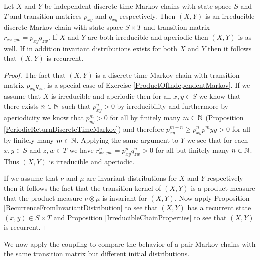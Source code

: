 \begin{lem}\label{CouplingIndependentMarkovChainsDiscreteTime}Let $X$ and $Y$ be independent discrete time
  Markov chains with state space $S$ and $T$ and transition matrices $p_{xy}$
  and $q_{xy}$ respectively.  Then $(X,Y)$ is an irreducible discrete
  Markov chain with state space $S \times T$ and transition matrix
  $r_{xz,yw} = p_{xy}q_{zw}$.  If $X$ and $Y$ are both irreducible
    and aperiodic then $(X,Y)$ is as well.  If in addition invariant
    distributions exists for both $X$ and $Y$ then it follows that
    $(X,Y)$ is recurrent.
\end{lem}
\begin{proof}
The fact that $(X,Y)$ is a discrete time Markov chain with transition
matrix $p_{xy}q_{zw}$ is a special case of Exercise
\ref{ProductOfIndependentMarkov}.  If we assume that $X$ is
irreducible and aperiodic then for all $x,y \in S$ we know that there
exists $n \in \mathbb{N}$ such that $p_{xy}^n > 0$ by irreducibility
and furthermore by aperiodicity we know that $p_{yy}^m > 0$ for all by
finitely many $m \in \mathbb{N}$ (Proposition
\ref{PeriodicReturnDiscreteTimeMarkov}) and therefore $p^{m+n}_{xy}
\geq p^n_{xy}p^m{yy} > 0$ for all by finitely many $m \in \mathbb{N}$.
Applying the same argument to $Y$ we see that for each $x,y \in S$ and
$z,w \in T$ we have $r_{xz,yw}^n =
p^n_{xy}q^n_{zw} > 0$ for all  but finitely many $n \in \mathbb{N}$.
Thus $(X,Y)$ is irreducible and aperiodic.

If we assume that $\nu$ and $\mu$ are invariant distributions for $X$
and $Y$ respectively then it follows the fact that the transition
kernel of $(X,Y)$ is a product measure that the product measure $\nu
\otimes \mu$ is invariant for $(X,Y)$.  Now apply Proposition
\ref{RecurrenceFromInvariantDistribution} to see that $(X,Y)$ has a
recurrent state $(x,y) \in S \times T$ and Proposition
\ref{IrreducibleChainProperties} to see that $(X,Y)$ is recurrent.
\end{proof}

We now apply the coupling to compare the behavior of a pair Markov
chains with the same transition matrix but different initial
distributions.  

